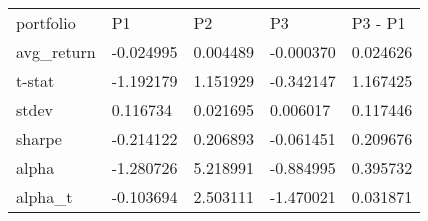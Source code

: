 \begin{tabular}{lllll}
\toprule
\midrule
portfolio & P1 & P2 & P3 & P3 - P1 \\
avg_return & -0.024995 & 0.004489 & -0.000370 & 0.024626 \\
t-stat & -1.192179 & 1.151929 & -0.342147 & 1.167425 \\
stdev & 0.116734 & 0.021695 & 0.006017 & 0.117446 \\
sharpe & -0.214122 & 0.206893 & -0.061451 & 0.209676 \\
alpha & -1.280726 & 5.218991 & -0.884995 & 0.395732 \\
alpha_t & -0.103694 & 2.503111 & -1.470021 & 0.031871 \\
\bottomrule
\end{tabular}
